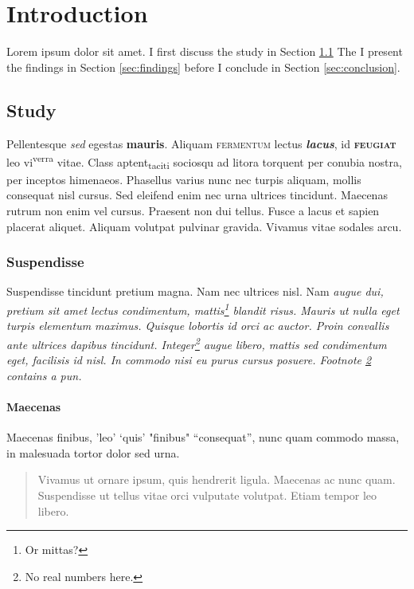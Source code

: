 \chapter{Introduction}\label{sec:intro}
Lorem ipsum dolor sit amet. I first discuss the study in 
Section \ref{sec:study}
The I present the findings in 
Section \ref{sec:findings}
before I conclude in 
Section \ref{sec:conclusion}.

\citet{Chomsky1957}

\section{Study}\label{sec:study}
Pellentesque \textit{sed} egestas \textbf{mauris}. Aliquam \textsc{fermentum} lectus \textit{\textbf{lacus}}, id \textbf{\textsc{feugiat}} leo vi\textsuperscript{verra} vitae. Class aptent\textsubscript{taciti} sociosqu ad litora torquent per conubia nostra, per inceptos himenaeos. Phasellus varius nunc nec turpis aliquam, mollis consequat nisl cursus. Sed eleifend enim nec urna ultrices tincidunt. Maecenas rutrum non enim vel cursus. Praesent non dui tellus. Fusce a lacus et sapien placerat aliquet. Aliquam volutpat pulvinar gravida. Vivamus vitae sodales arcu. 

\subsection{Suspendisse}
Suspendisse tincidunt \large pretium \LARGE magna. \tiny Nam \footnotesize nec ultrices nisl. \scriptsize Nam \itshape augue dui, \normalsize pretium \upshape  sit amet lectus condimentum, mattis\footnote{Or mittas?} blandit risus. Mauris ut nulla eget turpis elementum maximus. Quisque lobortis id orci ac auctor. Proin convallis ante ultrices dapibus tincidunt. Integer\footnote{\label{fn:integer}No real numbers here.} augue libero, mattis sed condimentum eget, facilisis id nisl. In commodo nisi eu purus cursus posuere. Footnote \ref{fn:integer} contains a pun. 

\subsubsection{Maecenas}
Maecenas finibus, 'leo' `quis' "finibus" ``consequat'', nunc quam commodo massa, in malesuada tortor dolor sed urna. 

\begin{quote}
Vivamus ut ornare ipsum, quis hendrerit ligula. Maecenas ac nunc quam. Suspendisse ut tellus vitae orci vulputate volutpat. Etiam tempor leo libero.
\end{quote}

